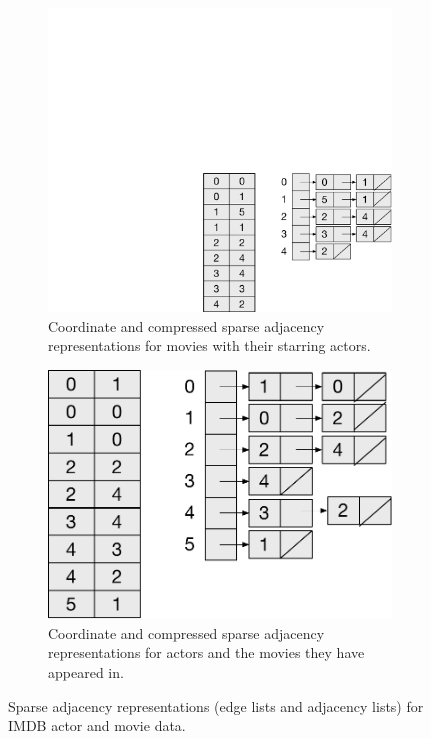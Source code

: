 \begin{figure}[ht]
 \begin{subfigure}[t]{0.4\textwidth}
    \small
    \centering
    \includegraphics[width=0.825\linewidth]{figs/movie-actor-sparse-adjacency}
    \caption{\label{fig:actor-table}
    Coordinate and compressed sparse adjacency representations for movies with their starring actors.}
  \end{subfigure}
\hspace{1em}  
   \begin{subfigure}[t]{0.4\textwidth}
    \small
    \centering
    \includegraphics[width=0.825\linewidth]{figs/actor-movie-sparse-adjacency}
    \caption{\label{fig:movie-table}
    Coordinate and compressed sparse adjacency representations for actors and the movies they have appeared in.}
  \end{subfigure}
  \caption{Sparse adjacency representations (edge lists and adjacency lists) for IMDB actor and movie data.}
\end{figure}

